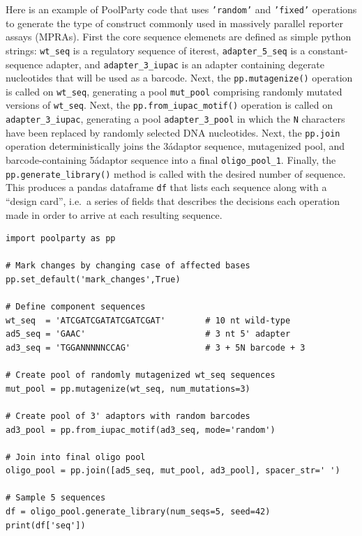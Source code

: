\documentclass[11pt]{article}
\newcommand{\inpy}[1]{\texttt{#1}}
\begin{document}
Here is an example of PoolParty code that uses \inpy{'random'} and \inpy{'fixed'} operations to generate the type of construct commonly used in massively parallel reporter assays (MPRAs). First the core sequence elemenets are defined as simple python strings: \inpy{wt_seq} is a regulatory sequence of iterest, \inpy{adapter_5_seq} is a constant-sequence adapter, and \inpy{adapter_3_iupac} is an adapter containing degerate nucleotides that will be used as a barcode. Next, the \inpy{pp.mutagenize()} operation is called on \inpy{wt_seq}, generating a pool \inpy{mut_pool} comprising randomly mutated versions of \inpy{wt_seq}. Next, the \inpy{pp.from_iupac_motif()} operation is called on \inpy{adapter_3_iupac}, generating a pool \inpy{adapter_3_pool} in which the \inpy{N} characters have been replaced by randomly selected DNA nucleotides. Next, the \inpy{pp.join} operation deterministically joins the 3\' adaptor sequence, mutagenized pool, and barcode-containing 5\' adaptor sequence into a final \inpy{oligo_pool_1}. Finally, the \inpy{pp.generate_library()} method is called with the desired number of sequence. This produces a pandas dataframe \inpy{df} that lists each sequence along with a ``design card'', i.e.\ a series of fields that describes the decisions each operation made in order to arrive at each resulting sequence.

\begin{verbatim}
import poolparty as pp

# Mark changes by changing case of affected bases
pp.set_default('mark_changes',True)

# Define component sequences
wt_seq  = 'ATCGATCGATATCGATCGAT'        # 10 nt wild-type
ad5_seq = 'GAAC'                        # 3 nt 5' adapter
ad3_seq = 'TGGANNNNNCCAG'               # 3 + 5N barcode + 3

# Create pool of randomly mutagenized wt_seq sequences
mut_pool = pp.mutagenize(wt_seq, num_mutations=3)

# Create pool of 3' adaptors with random barcodes
ad3_pool = pp.from_iupac_motif(ad3_seq, mode='random')

# Join into final oligo pool
oligo_pool = pp.join([ad5_seq, mut_pool, ad3_pool], spacer_str=' ')

# Sample 5 sequences
df = oligo_pool.generate_library(num_seqs=5, seed=42)
print(df['seq'])
\end{verbatim}
\end{document}

